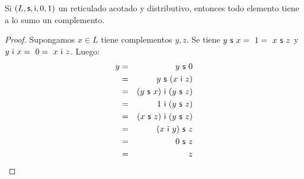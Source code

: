   \begin{lemma} \label{lemma_21}
    \PN Si $(L, \mathsf{s}, \mathsf{i}, 0, 1)$ un reticulado acotado y distributivo, entonces todo elemento tiene a lo sumo un complemento.
  \end{lemma}
  \begin{proof}
    \PN Supongamos $x \in L$ tiene complementos $y, z$. Se tiene $y \ \SU \ x = \ 1 = \ x \ \SU \ z$ y $y \ \mathsf{i} \ x = \
    0 = \ x \ \mathsf{i} \ z$. Luego:
    \begin{eqnarray*}
      y &=& y \ \mathsf{s} \ 0 \\
      &=& y \ \mathsf{s} \ (x \ \mathsf{i} \ z) \\
      &=& (y \ \mathsf{s} \ x) \ \mathsf{i} \ (y \ \mathsf{s} \ z) \\
      &=& 1 \ \mathsf{i} \ (y \ \mathsf{s} \ z) \\
      &=& (x \ \mathsf{s} \ z) \ \mathsf{i} \ (y \ \mathsf{s} \ z) \\
      &=& (x \ \mathsf{i} \ y) \ \mathsf{s} \ z \\
      &=& 0 \ \mathsf{s} \ z \\
      &=& z
    \end{eqnarray*}
  \end{proof}

